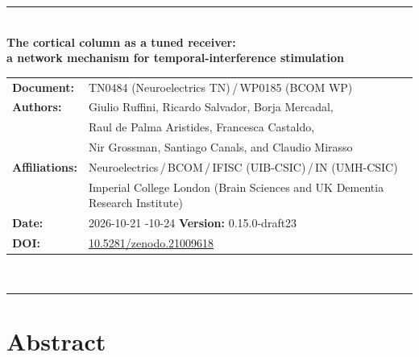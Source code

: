 \documentclass[11pt,a4paper]{article}
\newif\ifsupp
\newcommand{\paperver}{0.15.0-draft23} %
\providecommand{\DIFaddtex}[1]{{\protect\color{blue} \sf #1}} %
\providecommand{\DIFdeltex}[1]{{\protect\color{red} \scriptsize #1}} %
\providecommand{\DIFaddbegin}{} %
\providecommand{\DIFaddend}{} %
\providecommand{\DIFdelbegin}{} %
\providecommand{\DIFdelend}{} %
\providecommand{\DIFadd}[1]{\texorpdfstring{\DIFaddtex{#1}}{#1}} %
\providecommand{\DIFdel}[1]{\texorpdfstring{\DIFdeltex{#1}}{}} %
\begin{document}
\vspace{6pt}
\else
\begin{flushleft}
{\color{neblue}\rule{\textwidth}{2pt}}\\[4pt]
{\LARGE\bfseries The cortical column as a tuned receiver:\\[2pt]
a network mechanism for temporal-interference stimulation}\\[10pt]
\begin{tabular}{@{}ll@{}}
\textbf{Document:} & TN0484 (Neuroelectrics TN)\,/\,WP0185 (BCOM WP) \\
\textbf{Authors:} & Giulio Ruffini, Ricardo Salvador, Borja Mercadal,\\
& Raul de Palma Aristides, Francesca Castaldo,\\
& Nir Grossman, Santiago Canals, and Claudio Mirasso \\
\textbf{Affiliations:} & Neuroelectrics\,/\,BCOM\,/\,IFISC (UIB-CSIC)\,/\,IN (UMH-CSIC)\\
& Imperial College London (Brain Sciences and UK Dementia Research Institute) \\
\textbf{Date:} & \DIFdelbegin \DIFdel{2026-10-21 }\DIFdelend \DIFaddbegin \DIFadd{2026-10-24 }\DIFaddend \qquad \textbf{Version:} \paperver \\
\textbf{DOI:} & \href{https://doi.org/10.5281/zenodo.21009618}{10.5281/zenodo.21009618} \\
\end{tabular}\\[4pt]
{\color{neblue}\rule{\textwidth}{1pt}}
\end{flushleft}
\fi

\ifsupp
\begin{center}
{\large\bfseries Supplementary Material}\\[4pt]
\begin{minipage}{0.86\textwidth}\centering\small
Additional methods, derivations, and figures accompanying the article. Sections, equations, and figures use S-prefixed numbers;
references to article equations are marked as main-text references.
\end{minipage}
\end{center}
\vspace{8pt}
\fi

\ifsupp\else
\section*{Abstract}
\end{document}
